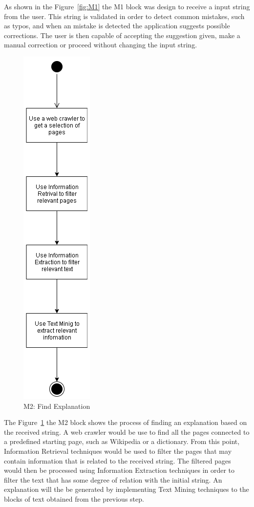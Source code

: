 As shown in the Figure~\ref{fig:M1} the M1 block was design to receive a input string from the user.
This string is validated in order to detect common mistakes, such as typos, and when an mistake is detected the application suggests possible corrections.
The user is then capable of accepting the suggestion given, make a manual correction or proceed without changing the input string.

\begin{figure}[H]
\centering
\includegraphics[scale=0.5]{ch4/assets/M2.png}
\caption[Find Explanation Module]{M2: Find Explanation}
\label{fig:M2}
\end{figure}

The Figure~\ref{fig:M2} the M2 block shows the process of finding an explanation based on the received string.
A web crawler would be use to find all the pages connected to a predefined starting page, such as Wikipedia or a dictionary.
From this point, Information Retrieval techniques would be used to filter the pages that may contain information that is related to the received string.
The filtered pages would then be processed using Information Extraction techniques in order to filter the text that has some degree of relation with the initial string.
An explanation will the be generated by implementing Text Mining techniques to the blocks of text obtained from the previous step.

